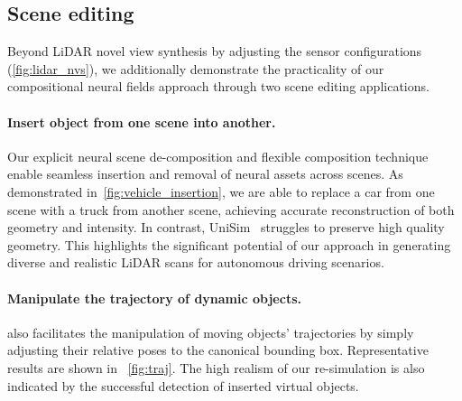 


% 

\subsection{Scene editing}
Beyond LiDAR novel view synthesis by adjusting the sensor configurations (\cf \cref{fig:lidar_nvs}), we additionally demonstrate the practicality of our compositional neural fields approach through two scene editing applications.


\paragraph{Insert object from one scene into another.}
Our explicit neural scene de-composition and flexible composition technique enable seamless insertion and removal of neural assets across scenes. As demonstrated in~\cref{fig:vehicle_insertion}, we are able to replace a car from one scene with a truck from another scene, achieving accurate reconstruction of both geometry and intensity. In contrast, UniSim~\cite{yang2023unisim} struggles to preserve high quality geometry. This highlights the significant potential of our approach in generating diverse and realistic LiDAR scans for autonomous driving scenarios.


\paragraph{Manipulate the trajectory of dynamic objects.}
\dynfl also facilitates the manipulation of moving objects' trajectories by simply adjusting their relative poses to the canonical bounding box. Representative results are shown in ~\cref{fig:traj}. The high realism of our re-simulation is also indicated by the successful detection of inserted virtual objects.
